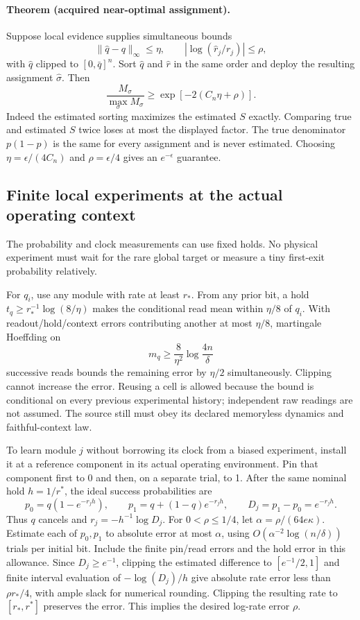 \paragraph{Theorem (acquired near-optimal assignment).}
Suppose local evidence supplies simultaneous bounds
\[
 \|\widehat q-q\|_\infty\le\eta,\qquad
 |\log(\widehat r_j/r_j)|\le\rho,
\]
with $\widehat q$ clipped to $[0,\bar q]^n$.
Sort $\widehat q$ and $\widehat r$ in the same order and deploy the
resulting assignment $\widehat\sigma$.  Then
\begin{equation}
 \frac{M_{\widehat\sigma}}{\max_\sigma M_\sigma}
       \ge \exp[-2(C_n\eta+\rho)].
 \label{eq:acquiredsorting}
\end{equation}
Indeed the estimated sorting maximizes the estimated $S$ exactly.
Comparing true and estimated $S$ twice loses at most the displayed
factor.  The true denominator $p(1-p)$ is the same for every assignment
and is never estimated.  Choosing $\eta=\epsilon/(4C_n)$ and
$\rho=\epsilon/4$ gives an $e^{-\epsilon}$ guarantee.

\subsection{Finite local experiments at the actual operating context}
The probability and clock measurements can use fixed holds.  No physical
experiment must wait for the rare global target or measure a tiny first-exit
probability relatively.

For $q_i$, use any module with rate at least $r_*$.  From any prior bit,
a hold $t_q\ge r_*^{-1}\log(8/\eta)$ makes the conditional read mean
within $\eta/8$ of $q_i$.  With readout/hold/context errors contributing
another at most $\eta/8$, martingale Hoeffding on
\[
 m_q\ge\frac{8}{\eta^2}\log\frac{4n}{\delta}
\]
successive reads bounds the remaining error by $\eta/2$ simultaneously.
Clipping cannot increase the error.  Reusing a cell is allowed because the
bound is conditional on every previous experimental history; independent
raw readings are not assumed.  The source still must obey its declared
memoryless dynamics and faithful-context law.

To learn module $j$ without borrowing its clock from a biased experiment,
install it at a reference component in its actual operating environment.
Pin that component first to 0 and then, on a separate trial, to 1.  After
the same nominal hold $h=1/r^*$, the ideal success probabilities are
\[
 p_0=q(1-e^{-r_jh}),\qquad
 p_1=q+(1-q)e^{-r_jh},\qquad
 D_j=p_1-p_0=e^{-r_jh}.
\]
Thus $q$ cancels and $r_j=-h^{-1}\log D_j$.
For $0<\rho\le1/4$, let
$\alpha=\rho/(64e\kappa)$.
Estimate each of $p_0,p_1$ to absolute error at most $\alpha$, using
$O(\alpha^{-2}\log(n/\delta))$ trials per initial bit.  Include the
finite pin/read errors and the hold error in this allowance.  Since
$D_j\ge e^{-1}$, clipping the estimated difference to
$[e^{-1}/2,1]$ and finite interval evaluation of $-\log(D_j)/h$ give
absolute rate error less than $\rho r_*/4$, with ample slack for numerical
rounding.  Clipping the resulting rate to $[r_*,r^*]$ preserves the error.
This implies the desired log-rate error $\rho$.

